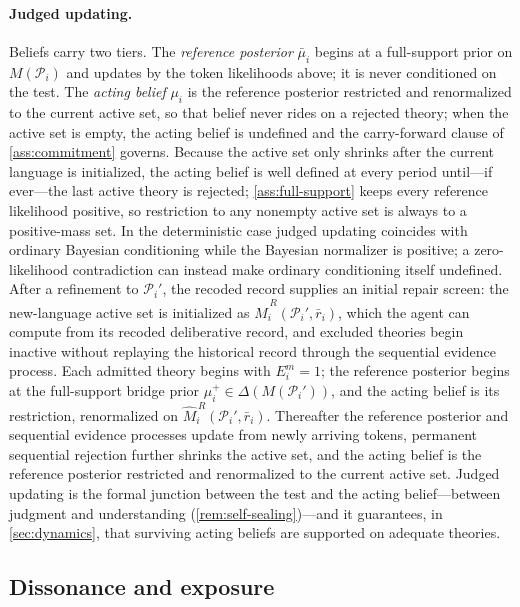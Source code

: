 \documentclass[11pt]{article}
\theoremstyle{definition}
\begin{document}
\paragraph{Judged updating.}
Beliefs carry two tiers.
The \emph{reference posterior} $\bar\mu_i$ begins at a full-support prior on $M(\mathcal P_i)$ and updates by the token likelihoods above; it is never conditioned on the test.
The \emph{acting belief} $\mu_i$ is the reference posterior restricted and renormalized to the current active set, so that belief never rides on a rejected theory; when the active set is empty, the acting belief is undefined and the carry-forward clause of \cref{ass:commitment} governs.
Because the active set only shrinks after the current language is initialized, the acting belief is well defined at every period until---if ever---the last active theory is rejected; \cref{ass:full-support} keeps every reference likelihood positive, so restriction to any nonempty active set is always to a positive-mass set.
In the deterministic case judged updating coincides with ordinary Bayesian conditioning while the Bayesian normalizer is positive; a zero-likelihood contradiction can instead make ordinary conditioning itself undefined.
After a refinement to $\mathcal P_i'$, the recoded record supplies an initial repair screen: the new-language active set is initialized as $\widehat M_i^{\,R}(\mathcal P_i',\bar r_i)$, which the agent can compute from its recoded deliberative record, and excluded theories begin inactive without replaying the historical record through the sequential evidence process.
Each admitted theory begins with $E_i^m=1$; the reference posterior begins at the full-support bridge prior $\mu_i^+\in\Delta(M(\mathcal P_i'))$, and the acting belief is its restriction, renormalized on $\widehat M_i^{\,R}(\mathcal P_i',\bar r_i)$.
Thereafter the reference posterior and sequential evidence processes update from newly arriving tokens, permanent sequential rejection further shrinks the active set, and the acting belief is the reference posterior restricted and renormalized to the current active set.
Judged updating is the formal junction between the test and the acting belief---between judgment and understanding (\cref{rem:self-sealing})---and it guarantees, in \cref{sec:dynamics}, that surviving acting beliefs are supported on adequate theories.

\subsection{Dissonance and exposure}
\end{document}
